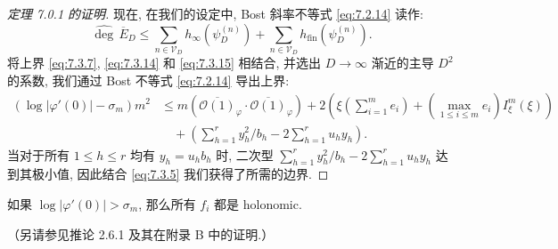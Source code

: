 \begin{proof}[定理 7.0.1 的证明]
现在, 在我们的设定中, Bost 斜率不等式 \eqref{eq:7.2.14} 读作:
\begin{equation}\label{eq:7.3.16}
\widehat{\operatorname{deg}} \, \overline{E}_D \le \sum_{n \in \mathcal{V}_D} h_{\infty}(\psi_D^{(n)}) + \sum_{n \in \mathcal{V}_D} h_{\operatorname{fin}}(\psi_D^{(n)}).
\end{equation}
将上界 \eqref{eq:7.3.7}, \eqref{eq:7.3.14} 和 \eqref{eq:7.3.15} 相结合, 
并选出 \(D \to \infty\) 渐近的主导 \(D^2\) 的系数, 
我们通过 Bost 不等式 \eqref{eq:7.2.14} 导出上界:
\[
\begin{aligned}
(\log |\varphi'(0)| - \sigma_m)m^2 
&\le m \left(\overline{\mathcal{O}(1)}_{\varphi} \cdot \overline{\mathcal{O}(1)}_{\varphi}\right) + 2\left(\xi \left(\sum_{i=1}^m e_i\right) + \left(\max_{1 \le i \le m} e_i\right) I_{\xi}^m(\xi)\right) \\
&\quad + \left(\sum_{h=1}^r y_h^2/b_h - 2\sum_{h=1}^r u_h y_h\right).
\end{aligned}
\]
当对于所有 \(1 \le h \le r\) 均有 \(y_h = u_h b_h\) 时, 二次型 \(\sum_{h=1}^{r} y_h^2/b_h - 2\sum_{h=1}^{r} u_h y_h\) 
达到其极小值, 因此结合 \eqref{eq:7.3.5} 我们获得了所需的边界.
\end{proof}

\begin{lemma}\label{lem:7.3.17}
如果 \(\log |\varphi'(0)| > \sigma_m\), 那么所有 \(f_i\) 都是 holonomic.
\end{lemma}

（另请参见推论 2.6.1 及其在附录 B 中的证明.）

